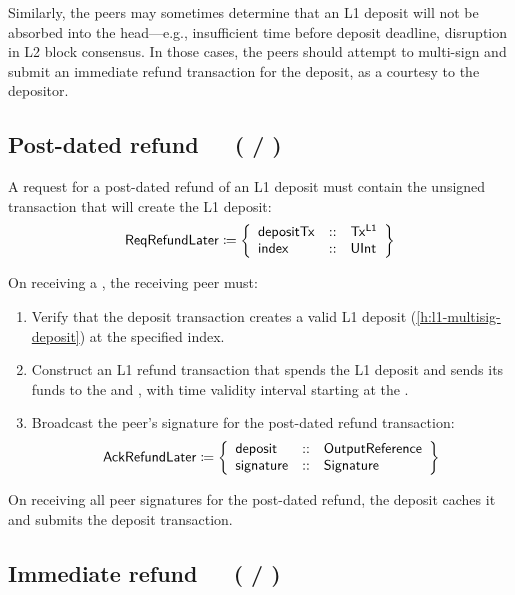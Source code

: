 \documentclass[../hydrozoa.tex]{subfiles}
\begin{document}
Similarly, the peers may sometimes determine that an L1 deposit will not be absorbed into the head---e.g., insufficient time before deposit deadline, disruption in L2 block consensus.
In those cases, the peers should attempt to multi-sign and submit an immediate refund transaction for the deposit, as a courtesy to the depositor.

\subsection{Post-dated refund~~~( / )}%
\label{h:l2-consensus-post-dated-refund}%

A request for a post-dated refund of an L1 deposit must contain the unsigned transaction that will create the L1 deposit:
\begin{equation*}
  \mathsf{ReqRefundLater} \coloneq \left\{
  \begin{array}{lll}
    \mathsf{depositTx} &::& \mathsf{Tx^{L1}} \\
    \mathsf{index} &::& \mathsf{UInt}
  \end{array}\right\}
\end{equation*}

On receiving a , the receiving peer must:
\begin{enumerate}
  \item Verify that the deposit transaction creates a valid L1 deposit (\cref{h:l1-multisig-deposit}) at the specified index.
  \item Construct an L1 refund transaction that spends the L1 deposit and sends its funds to the  and , with time validity interval starting at the .
  \item Broadcast the peer's signature for the post-dated refund transaction:
    \begin{equation*}
      \mathsf{AckRefundLater} \coloneq \left\{
      \begin{array}{lll}
        \mathsf{deposit} &::& \mathsf{OutputReference} \\
        \mathsf{signature} &::& \mathsf{Signature}
      \end{array}\right\}
    \end{equation*}
\end{enumerate}
On receiving all peer signatures for the post-dated refund, the deposit caches it and submits the deposit transaction.

\subsection{Immediate refund~~~( / )}%
\label{h:l2-consensus-immediate-refund}%
\end{document}
